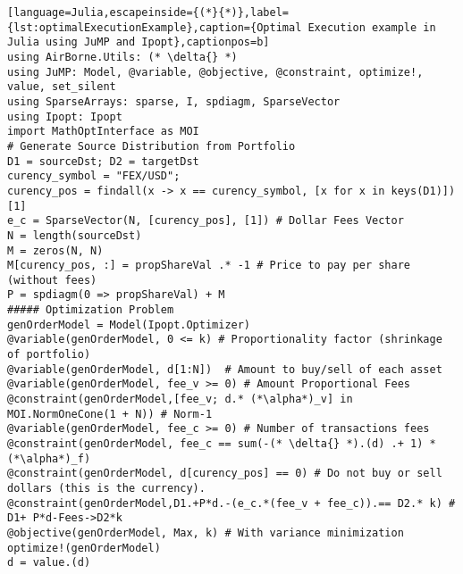 \begin{lstlisting}[language=Julia,escapeinside={(*}{*)},label={lst:optimalExecutionExample},caption={Optimal Execution example in Julia using JuMP and Ipopt},captionpos=b]
using AirBorne.Utils: (* \delta{} *)
using JuMP: Model, @variable, @objective, @constraint, optimize!, value, set_silent
using SparseArrays: sparse, I, spdiagm, SparseVector
using Ipopt: Ipopt
import MathOptInterface as MOI
# Generate Source Distribution from Portfolio
D1 = sourceDst; D2 = targetDst
curency_symbol = "FEX/USD";
curency_pos = findall(x -> x == curency_symbol, [x for x in keys(D1)])[1]
e_c = SparseVector(N, [curency_pos], [1]) # Dollar Fees Vector
N = length(sourceDst)
M = zeros(N, N)
M[curency_pos, :] = propShareVal .* -1 # Price to pay per share (without fees)
P = spdiagm(0 => propShareVal) + M
##### Optimization Problem
genOrderModel = Model(Ipopt.Optimizer)
@variable(genOrderModel, 0 <= k) # Proportionality factor (shrinkage of portfolio)
@variable(genOrderModel, d[1:N])  # Amount to buy/sell of each asset
@variable(genOrderModel, fee_v >= 0) # Amount Proportional Fees
@constraint(genOrderModel,[fee_v; d.* (*\alpha*)_v] in MOI.NormOneCone(1 + N)) # Norm-1
@variable(genOrderModel, fee_c >= 0) # Number of transactions fees
@constraint(genOrderModel, fee_c == sum(-(* \delta{} *).(d) .+ 1) * (*\alpha*)_f) 
@constraint(genOrderModel, d[curency_pos] == 0) # Do not buy or sell dollars (this is the currency).
@constraint(genOrderModel,D1.+P*d.-(e_c.*(fee_v + fee_c)).== D2.* k) # D1+ P*d-Fees->D2*k
@objective(genOrderModel, Max, k) # With variance minimization
optimize!(genOrderModel)
d = value.(d)
\end{lstlisting}